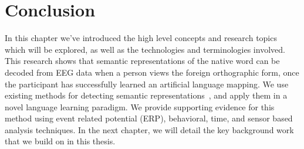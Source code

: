 \section{Conclusion}

In this chapter we've introduced the high level concepts and research topics 
which will be explored, as well as the technologies and terminologies involved.  
This research shows that semantic representations of the native word can be 
decoded from EEG data when a person views the foreign orthographic form, once 
the participant has successfully learned an artificial language mapping.  We 
use existing methods for detecting semantic representations~\cite{Sudre2012}, 
and apply them in a novel language learning paradigm. We provide supporting 
evidence for this method using event related potential (ERP), behavioral, time, 
and sensor based analysis techniques. In the next chapter, we will detail the 
key background work that we build on in this thesis. 

